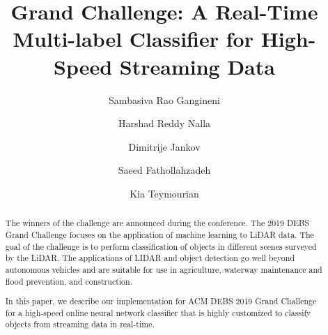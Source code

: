 \documentclass[sigconf]{acmart}
\begin{document}
%
\title{Grand Challenge: A Real-Time Multi-label Classifier for High-Speed Streaming Data}

%



\author{Sambasiva Rao Gangineni}

\author{Harshad Reddy Nalla}

\author{Dimitrije Jankov}

\author{Saeed Fathollahzadeh}

\author{Kia Teymourian}



%
\renewcommand{\shortauthors}{Kia Teymourian, et al.}

%
\begin{abstract}
The winners of the challenge are announced during the conference. The 2019 DEBS Grand Challenge focuses on the application of machine learning to LiDAR data. The goal of the challenge is to perform classification of objects in different scenes surveyed by the LiDAR. The applications of LIDAR and object detection go well beyond autonomous vehicles and are suitable for use in agriculture, waterway maintenance and flood prevention, and construction.

In this paper, we describe our implementation for ACM DEBS 2019 Grand Challenge for a high-speed online neural network classifier that is highly customized to classify objects from streaming data in real-time.
\end{abstract}
\end{document}
